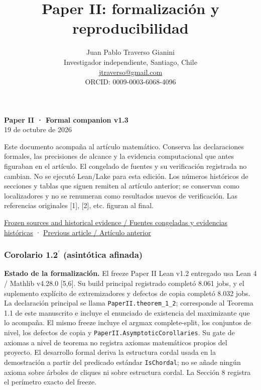 \documentclass[spanish,11pt,a4paper]{article}
\title{Paper II: formalización y reproducibilidad}
\author{Juan Pablo Traverso Gianini\\\small Investigador independiente, Santiago, Chile\\\small \href{mailto:jtraverso@gmail.com}{jtraverso@gmail.com}\\\small ORCID: 0009-0003-6068-4096}
\date{}
\begin{document}
\raggedbottom
\maketitle
\textbf{Paper II · Formal companion v1.3}\\
19 de octubre de 2026

Este documento acompaña al artículo matemático. Conserva las
declaraciones formales, las precisiones de alcance y la evidencia
computacional que antes figuraban en el artículo. El congelado de
fuentes y su verificación registrada no cambian. No se ejecutó Lean/Lake
para esta edición. Los números históricos de secciones y tablas que
siguen remiten al artículo anterior; se conservan como localizadores y
no se renumeran como resultados nuevos de verificación. Las referencias
originales {[}1{]}, {[}2{]}, etc. figuran al final.

\href{https://github.com/jtraverso/erdos-81-chordal-clique-partitions/tree/eb335845bfa23375d5040ea31fc4f4b366346287/preprints/PAPER_II/05_formalization}{Frozen
sources and historical evidence / Fuentes congeladas y evidencias
históricas} ·
\href{https://github.com/jtraverso/erdos-81-chordal-clique-partitions/tree/eb335845bfa23375d5040ea31fc4f4b366346287/preprints/PAPER_II/01_manuscript}{Previous
article / Artículo anterior}

\subsubsection{\texorpdfstring{Corolario 1.2\(^{\prime}\) (asintótica
afinada)}{Corolario 1.2\^{}\{\textbackslash prime\} (asintótica afinada)}}\label{corolario-1.2prime-asintuxf3tica-afinada}

\textbf{Estado de la formalización.} El freeze Paper II Lean v1.2
entregado usa Lean 4 / Mathlib v4.28.0 {[}5,6{]}. Su build principal
registrado completó 8.061 jobs, y el suplemento explícito de
extremizadores y defectos de copia completó 8.032 jobs. La declaración
principal se llama \nolinkurl{PaperII.theorem_1_2}; corresponde al
Teorema 1.1 de este manuscrito e incluye el enunciado de existencia del
maximizante que lo acompaña. El mismo freeze incluye el argmax
complete-split, los conjuntos de nivel, los defectos de copia y
\nolinkurl{PaperII.AsymptoticCorollaries}. Su gate de axiomas a nivel de
teorema no registra axiomas matemáticos propios del proyecto. El
desarrollo formal deriva la estructura cordal usada en la demostración a
partir del predicado estándar \nolinkurl{IsChordal}; no se añade ningún
axioma sobre árboles de cliques ni sobre estructura cordal. La Sección 8
registra el perímetro exacto del freeze.
\end{document}
